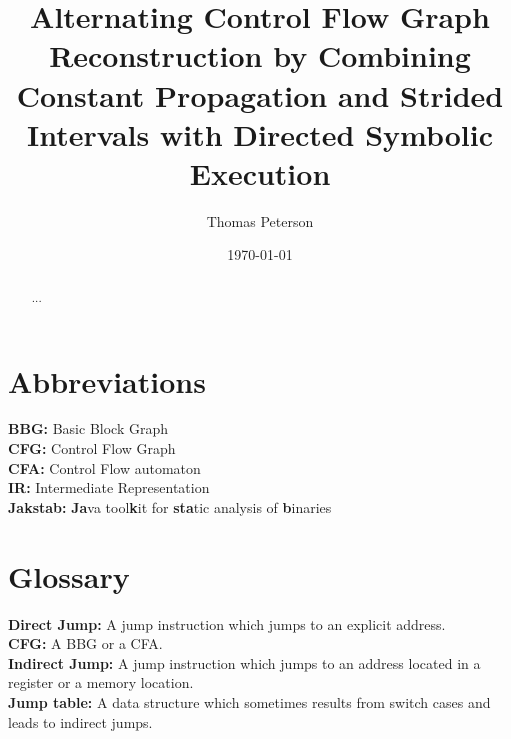 \documentclass{kththesis}
\title{Alternating Control Flow Graph Reconstruction by Combining Constant Propagation and Strided Intervals with Directed Symbolic Execution}
\author{Thomas Peterson}
\date{\today}
\newcommand{\MONTH}{%
  \ifcase\the\month
  \or January %
  \or February %
  \or March %
  \or April %
  \or May %
  \or June %
  \or July %
  \or August %
  \or September %
  \or October %
  \or November %
  \or December %
  \fi}
\renewcommand{\it}[1]{\textit{#1}}
\begin{document}
\frontmatter

\titlepage

\begin{abstract}
\end{abstract}


\begin{otherlanguage}{swedish}
  \begin{abstract}
    ...
  \end{abstract}
\end{otherlanguage}

\tableofcontents
\thispagestyle{empty}

\clearpage
\thispagestyle{empty}
\section*{Abbreviations}
\textbf{BBG:} Basic Block Graph\\
\textbf{CFG:} Control Flow Graph\\
\textbf{CFA:} Control Flow automaton\\
\textbf{IR:} Intermediate Representation\\
\textbf{Jakstab:} \textbf{Ja}va tool\textbf{k}it for \textbf{sta}tic analysis of \textbf{b}inaries\\

\clearpage
\thispagestyle{empty}
\section*{Glossary}
\textbf{Direct Jump:} A jump instruction which jumps to an explicit address.\\
\textbf{CFG:} A BBG or a CFA.\\
\textbf{Indirect Jump:} A jump instruction which jumps to an address located in a register or a memory location.\\
\textbf{Jump table:} A data structure which sometimes results from switch cases and leads to indirect jumps. \\
\end{document}
